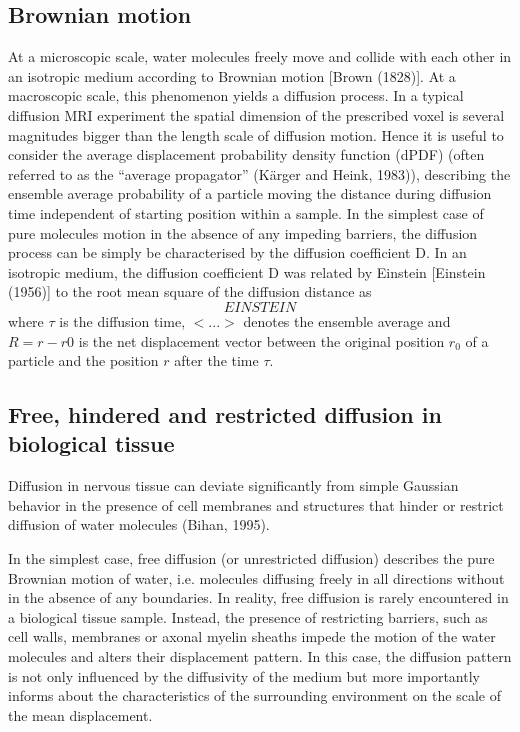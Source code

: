 \subsection{Brownian motion}
At a microscopic scale, water molecules freely move and collide with each other in an isotropic medium according to Brownian motion [Brown (1828)]. At a macroscopic scale, this phenomenon yields a diffusion process. In a typical diffusion MRI experiment the spatial dimension of the prescribed voxel is several magnitudes bigger than the length scale of diffusion motion. Hence it is useful to consider the average displacement probability density function (dPDF) (often referred to as the “average propagator” (Kärger and Heink, 1983)), describing the ensemble average probability of a particle moving the distance  during diffusion time  independent of starting position  within a sample. In the simplest case of pure molecules motion in the absence of any impeding barriers, the diffusion process can be simply be characterised by the diffusion coefficient D\citep{Fick}. In an isotropic medium, the diffusion coefficient D was related by Einstein [Einstein (1956)] to the root mean square of the diffusion distance as
\begin{equation}
	EINSTEIN
\end{equation}
where $\tau$ is the diffusion time, $<...>$ denotes the ensemble average and $R = r − r0$ is the net displacement vector between the original position $r_0$ of a particle and the position $r$ after the time $\tau$. 

\subsection[Types of diffusion]{Free, hindered and restricted diffusion in biological tissue}
Diffusion in nervous tissue can deviate significantly from simple Gaussian behavior in the presence of cell membranes and structures that hinder or restrict diffusion of water molecules (Bihan, 1995). 

In the simplest case, free diffusion (or unrestricted diffusion) describes the pure Brownian motion of water, i.e. molecules diffusing freely in all directions without in the absence of any boundaries. In reality, free diffusion is rarely encountered in a biological tissue sample. Instead, the presence of restricting barriers, such as cell walls, membranes or axonal myelin sheaths impede the motion of the water molecules and alters their displacement pattern. In this case, the diffusion pattern is not only influenced by the diffusivity of the medium but more importantly informs about the characteristics of the surrounding environment on the scale of the mean displacement. 

